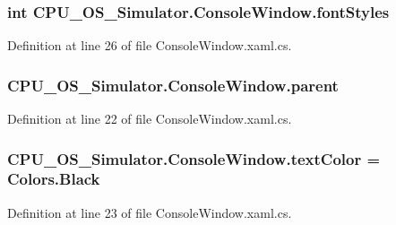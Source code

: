 \subsubsection[{font\+Styles}]{\setlength{\rightskip}{0pt plus 5cm}int C\+P\+U\+\_\+\+O\+S\+\_\+\+Simulator.\+Console\+Window.\+font\+Styles\hspace{0.3cm}{\ttfamily [private]}}\label{class_c_p_u___o_s___simulator_1_1_console_window_abe8a7e3f2f861cd266a24426b2ffbc1c}


Definition at line 26 of file Console\+Window.\+xaml.\+cs.

\hypertarget{class_c_p_u___o_s___simulator_1_1_console_window_a1e38326bb40f4ed44c4964d94dc6f809}{}
\subsubsection[{parent}]{ C\+P\+U\+\_\+\+O\+S\+\_\+\+Simulator.\+Console\+Window.\+parent\hspace{0.3cm}{\ttfamily [private]}}\label{class_c_p_u___o_s___simulator_1_1_console_window_a1e38326bb40f4ed44c4964d94dc6f809}


Definition at line 22 of file Console\+Window.\+xaml.\+cs.

\hypertarget{class_c_p_u___o_s___simulator_1_1_console_window_a155c42bee25bd537a2656828bdf6f527}{}
\subsubsection[{text\+Color}]{ C\+P\+U\+\_\+\+O\+S\+\_\+\+Simulator.\+Console\+Window.\+text\+Color = Colors.\+Black\hspace{0.3cm}{\ttfamily [private]}}\label{class_c_p_u___o_s___simulator_1_1_console_window_a155c42bee25bd537a2656828bdf6f527}


Definition at line 23 of file Console\+Window.\+xaml.\+cs.



